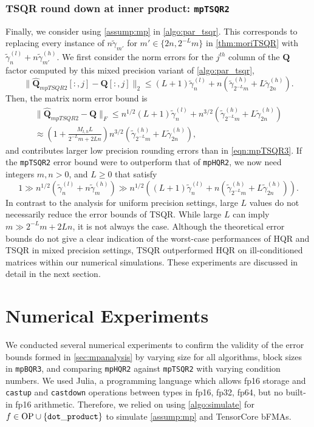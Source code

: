 \documentclass[review,onefignum,onetabnum]{siamart190516}
\newcommand{\bb}[1]{\mathbf{#1}}
\begin{document}
\subsubsection{TSQR round down at inner product: {\tt mpTSQR2}}
Finally, we consider using \cref{assump:mp} in \cref{algo:par_tsqr}.
This corresponds to replacing every instance of $n\tilde{\gamma}_{m'}$ for $m'\in\{2n, 2^{-L}m\}$ in \cref{thm:moriTSQR} with $\tilde{\gamma}_n^{(l)} + n\tilde{\gamma}_{m'}^{(h)}$.
We first consider the norm errors for the $j^{th}$ column of the $\bb{Q}$ factor computed by this mixed precision variant of \cref{algo:par_tsqr},
\begin{equation}
	\|\hat{\bb{Q}}_{mpTSQR2}[:,j] -\bb{Q}[:,j]\|_2 \leq (L+1)\tilde{\gamma}_n^{(l)} +n(\tilde{\gamma}_{2^{-L}m}^{(h)} + L\tilde{\gamma}_{ 2n}^{(h)}).\label{eqn:mptsqr2Qcol}
\end{equation} 
Then, the matrix norm error bound is 
\begin{align}
\|\hat{\bb{Q}}_{mpTSQR2}-\bb{Q}\|_F \leq n^{1/2}(L+1)\tilde{\gamma}_n^{(l)} +n^{3/2}(\tilde{\gamma}_{2^{-L}m}^{(h)} + L\tilde{\gamma}_{ 2n}^{(h)})\\
\approx \left(1+ \frac{M_{l,h}L}{2^{-L}m+ 2Ln}\right)n^{3/2}(\tilde{\gamma}_{2^{-L}m}^{(h)} + L\tilde{\gamma}_{ 2n}^{(h)}),\label{eqn:mptsqr2Q}
\end{align}
and contributes larger low precision rounding errors than in \cref{eqn:mpTSQR3}.
If the {\tt mpTSQR2} error bound were to outperform that of {\tt mpHQR2}, we now need integers $m, n > 0$, and $L\geq 0$ that satisfy
\begin{equation*}
1\gg n^{1/2}\left(\tilde{\gamma}_{n}^{(l)} + n\tilde{\gamma}_{m}^{(h)}\right) \gg n^{1/2}\left((L+1)\tilde{\gamma}_n^{(l)} +n(\tilde{\gamma}_{2^{-L}m}^{(h)} + L\tilde{\gamma}_{ 2n}^{(h)})\right).%
\end{equation*}
In contrast to the analysis for uniform precision settings, large $L$ values do not necessarily reduce the error bounds of TSQR. 
While large $L$ can imply $m\gg 2^{-L}m+2Ln$, it is not always the case.
Although the theoretical error bounds do not give a clear indication of the worst-case performances of HQR and TSQR in mixed precision settings, TSQR outperformed HQR on ill-conditioned matrices within our numerical simulations.
These experiments are discussed in detail in the next section.
\section{Numerical Experiments}\label{sec:NE}
%
We conducted several numerical experiments to confirm the validity of the error bounds formed in \cref{sec:mpanalysis} by varying size for all algorithms, block sizes in {\tt mpBQR3}, and comparing {\tt mpHQR2} against {\tt mpTSQR2} with varying condition numbers.
We used Julia, a programming language which allows fp16 storage and {\tt castup} and {\tt castdown} operations between types in {fp16, fp32, fp64}, but no built-in fp16 arithmetic.
Therefore, we relied on using \cref{algo:simulate} for $f\in \text{OP} \cup\{{\tt dot\_product}\}$ to simulate \cref{assump:mp} and TensorCore bFMAs.\par
\end{document}
